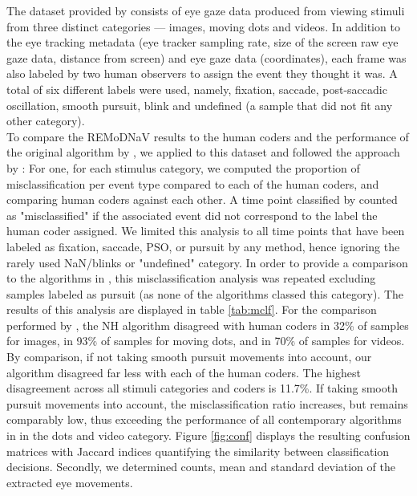 The dataset provided by \citep{Andersson2017} consists of eye gaze data produced from viewing stimuli from three distinct categories --- images, moving dots and videos. In addition to the eye tracking metadata (eye tracker sampling rate, size of the screen raw eye gaze data, distance from screen) and eye gaze data (coordinates), each frame was also labeled by two human observers to assign the event they thought it was. A total of six different labels were used, namely, fixation, saccade, post-saccadic oscillation, smooth pursuit, blink and undefined (a sample that did not fit any other category). \\
To compare the REMoDNaV results to the human coders and the performance of the original algorithm by \cite{Nystrom2010AnData}, we applied \remodnav to this dataset and followed the approach by \citet{Andersson2017}: For one, for each stimulus category, we computed the proportion of misclassification per event type compared to each of the human coders, and comparing human coders against each other. A time point classified by \remodnav counted as "misclassified" if the associated event did not correspond to the label the human coder assigned. We limited this analysis to all time points that have been labeled as fixation, saccade, PSO, or pursuit by any method, hence ignoring the rarely used NaN/blinks or "undefined" category.  In order to provide a comparison to the algorithms in \cite{Andersson2017}, this misclassification analysis was repeated excluding samples labeled as pursuit (as none of the algorithms classed this category). The results of this analysis are displayed in table \ref{tab:mclf}. For the comparison performed by \citet{Andersson2017}, the NH algorithm disagreed with human coders in 32\% of samples for images, in 93\% of samples for moving dots, and in 70\% of samples for videos. By comparison, if not taking smooth pursuit movements into account, our algorithm disagreed far less with each of the human coders. The highest disagreement across all stimuli categories and coders is 11.7\%. If taking smooth pursuit movements into account, the misclassification ratio increases, but remains comparably low, thus exceeding the performance of all contemporary algorithms in \citet{Andersson2017} in the dots and video category. Figure \ref{fig:conf} displays the resulting confusion matrices with Jaccard indices quantifying the similarity between classification decisions. Secondly, we determined counts, mean and standard deviation of the extracted eye movements.   

